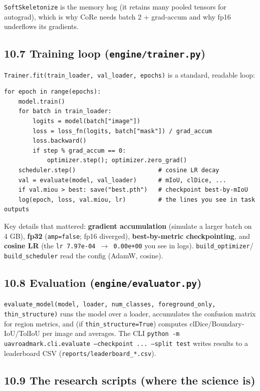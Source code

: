 \documentclass[11pt]{article}
\begin{document}
\texttt{SoftSkeletonize} is the memory hog (it retains many pooled tensors for autograd), which is why CoRe needs batch 2 + grad-accum and why fp16 underflows its gradients.

\subsection*{10.7 Training loop (\texttt{engine/trainer.py})}

\texttt{Trainer.fit(train\_loader, val\_loader, epochs)} is a standard, readable loop:

\begin{Verbatim}[breaklines=true,breakanywhere=true,fontsize=\footnotesize]
for epoch in range(epochs):
    model.train()
    for batch in train_loader:
        logits = model(batch["image"])
        loss = loss_fn(logits, batch["mask"]) / grad_accum
        loss.backward()
        if step % grad_accum == 0:
            optimizer.step(); optimizer.zero_grad()
    scheduler.step()                       # cosine LR decay
    val = evaluate(model, val_loader)      # mIoU, clDice, ...
    if val.miou > best: save("best.pth")   # checkpoint best-by-mIoU
    log(epoch, loss, val.miou, lr)         # the lines you see in task outputs
\end{Verbatim}

Key details that mattered: \textbf{gradient accumulation} (simulate a larger batch on 4 GB), \textbf{fp32} (\texttt{amp=false}; fp16 diverged), \textbf{best-by-metric checkpointing}, and \textbf{cosine LR} (the \texttt{lr 7.97e-04 $\rightarrow$ 0.00e+00} you see in logs). \texttt{build\_optimizer}/ \texttt{build\_scheduler} read the config (AdamW, cosine).

\subsection*{10.8 Evaluation (\texttt{engine/evaluator.py})}

\texttt{evaluate\_model(model, loader, num\_classes, foreground\_only, thin\_structure)} runs the model over a loader, accumulates the confusion matrix for region metrics, and (if \texttt{thin\_structure=True}) computes clDice/Boundary-IoU/TolIoU per image and averages. The CLI \texttt{python -m uavroadmark.cli.evaluate --checkpoint ... --split test} writes results to a leaderboard CSV (\texttt{reports/leaderboard\_*.csv}).

\subsection*{10.9 The research scripts (where the science is)}
\end{document}
